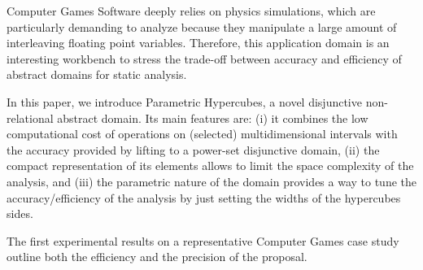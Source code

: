 Computer Games Software deeply relies on physics simulations, which are particularly demanding to analyze because they manipulate a large amount of interleaving floating point variables. Therefore, this application domain is an interesting workbench to stress the trade-off between accuracy and efficiency of abstract domains for static analysis.

In this paper, we introduce Parametric Hypercubes, a novel disjunctive non-relational abstract domain. Its main features are: (i) it combines the low computational cost of operations on (selected) multidimensional intervals with the accuracy provided by lifting to a power-set disjunctive domain, (ii) the compact representation of its elements allows to limit the space complexity of the analysis, and (iii) the parametric nature of the domain provides a way to tune the accuracy/efficiency of the analysis by just setting the widths of the hypercubes sides.

The first experimental results on a representative Computer Games case study outline both the efficiency and the precision of the proposal.
